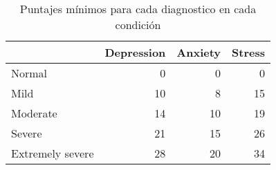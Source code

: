 \begin{appendices}
\begin{table}[ht]
\centering
\caption{Puntajes mínimos para cada diagnostico en cada condición}
\begin{tabular}{lrrr}
\toprule
{} &  Depression &  Anxiety &  Stress \\
\midrule
Normal           &  0 &  0 &  0 \\
Mild             &  10 &  8 &  15 \\
Moderate         &  14 &  10 &  19 \\
Severe           &  21 &  15 &  26 \\
Extremely severe &  28 &  20 &  34 \\
\bottomrule
\end{tabular}
\label{table:score_condition}
\end{table}%




\end{appendices}